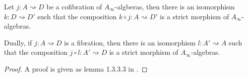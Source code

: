 \documentclass[../thesis.tex]{subfiles}
\begin{document}
        \begin{lemma}\label{lem: strict-replacement}
            Let $j: A \rightsquigarrow D$ be a cofibration of $A_\infty$-algberas, then there is an isomorphism $k: D\rightsquigarrow D'$ such that the composition $k\circ j : A \rightsquigarrow D'$ is a strict morphism of $A_\infty$-algebras.

            Dually, if $j: A \rightsquigarrow D$ is a fibration, then there is an isomorphism $l : A' \rightsquigarrow A$ such that the composition $j\circ l : A' \rightsquigarrow D$ is a strict morphism of $A_\infty$-algebras.
        \end{lemma}

        \begin{proof}
            A proof is given as lemma 1.3.3.3 in \cite{LefevreHasegawa03}.
        \end{proof}
\end{document}
